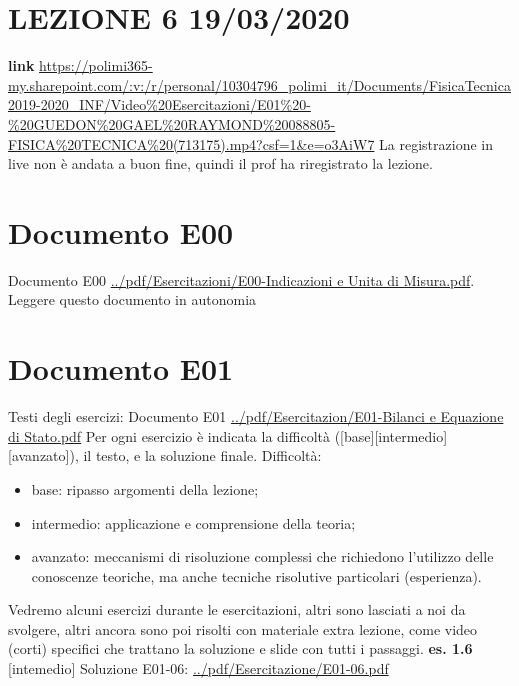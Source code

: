 \section*{LEZIONE 6 19/03/2020}
\textbf{link} \url{https://polimi365-my.sharepoint.com/:v:/r/personal/10304796_polimi_it/Documents/FisicaTecnica2019-2020_INF/Video%20Esercitazioni/E01%20-%20GUEDON%20GAEL%20RAYMOND%20088805-FISICA%20TECNICA%20(713175).mp4?csf=1&e=o3AiW7}\newline
La registrazione in live non è andata a buon fine, quindi il prof ha riregistrato la lezione.
\section*{Documento E00}
Documento E00 \url{../pdf/Esercitazioni/E00-Indicazioni e Unita di Misura.pdf}.\newline
\newline
Leggere questo documento in autonomia
\section*{Documento E01}
Testi degli esercizi:\newline
Documento E01 \url{../pdf/Esercitazion/E01-Bilanci e Equazione di Stato.pdf}\newline
\newline
Per ogni esercizio è indicata la difficoltà ([base][intermedio][avanzato]), il testo, e la soluzione finale.\newline
Difficoltà:
\begin{itemize}
    \item base: ripasso argomenti della lezione;
    \item intermedio: applicazione e comprensione della teoria;
    \item avanzato: meccanismi di risoluzione complessi che richiedono l'utilizzo delle conoscenze teoriche, ma anche tecniche risolutive particolari (esperienza).
\end{itemize}
Vedremo alcuni esercizi durante le esercitazioni, altri sono lasciati a noi da svolgere, altri ancora sono poi risolti con materiale extra lezione, come video (corti) specifici che trattano la soluzione e slide con tutti i passaggi.\newline
\newline
\textbf{es. 1.6} [intemedio]\newline
Soluzione E01-06: \url{../pdf/Esercitazione/E01-06.pdf}